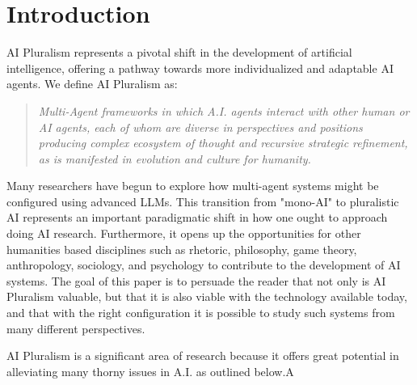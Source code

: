 \section{Introduction}
AI Pluralism represents a pivotal shift in the development of artificial intelligence, offering a pathway towards more individualized and adaptable AI agents. We define AI Pluralism as:

\begin{quote}
\textit{Multi-Agent frameworks in which A.I. agents interact with other human or AI agents, each of whom are diverse in perspectives and positions producing complex ecosystem of thought and recursive strategic refinement, as is manifested in evolution and culture for humanity.}
\end{quote}

Many researchers have begun to explore how multi-agent systems might be configured using advanced LLMs. This transition from "mono-AI" to pluralistic AI represents an important paradigmatic shift in how one ought to approach doing AI research. Furthermore, it opens up the opportunities for other humanities based disciplines such as rhetoric, philosophy, game theory, anthropology, sociology, and psychology to contribute to the development of AI systems. The goal of this paper is to persuade the reader that not only is AI Pluralism valuable, but that it is also viable with the technology available today, and that with the right configuration it is possible to study such systems from many different perspectives.

AI Pluralism is a significant area of research because it offers great potential in alleviating many thorny issues in A.I. as outlined below.A

